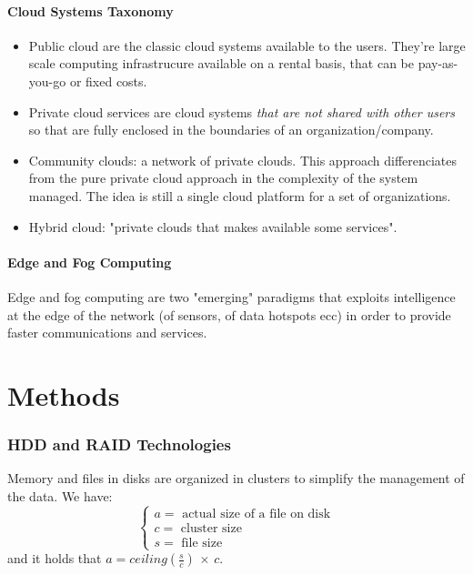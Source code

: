 \documentclass[10pt,a4paper]{article}
\begin{document}
			\subsection{Cloud Systems Taxonomy}
				\begin{itemize}
					\item Public cloud are the classic cloud systems available to the users. They're large scale computing infrastrucure available on a rental basis, that can be pay-as-you-go or fixed costs.
					\item Private cloud services are cloud systems \emph{that are not shared with other users} so that are fully enclosed in the boundaries of an organization/company.
					\item Community clouds: a network of private clouds. This approach differenciates from the pure private cloud approach in the complexity of the system managed. The idea is still a single cloud platform for a set of organizations.
					\item Hybrid cloud: "private clouds that makes available some services".
				\end{itemize}
				
			\subsection{Edge and Fog Computing}
				Edge and fog computing are two "emerging" paradigms that exploits intelligence at the edge of the network (of sensors, of data hotspots ecc) in order to provide faster communications and services.
			
	\part{Methods}
		\section{HDD and RAID Technologies}
			Memory and files in disks are organized in clusters to simplify the management of the data. We have:
			\begin{equation}
				\begin{cases}
					a = \text{ actual size of a file on disk}\\
					c = \text{ cluster size}\\
					s = \text{ file size}
				\end{cases}
			\end{equation}
			and it holds that $ a = ceiling(\frac{s}{c}) \,\times\, c$.
			
\end{document}
